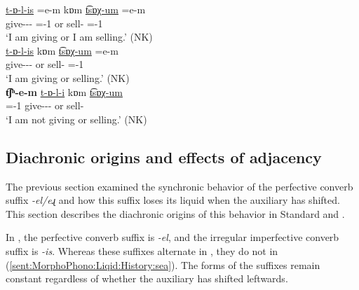\begin{exe}
	\ex \label{sent:MorphoPhono:Liqid:IrrgImpf:Coord}
	\begin{xlist}
		\ex \gll \uline{{t-ɒ-l-is}} \colorbox{lsLightGray}{=e-m} kɒm \uline{{t͡sɒχ-um}} \colorbox{lsLightGray}{=e-m} \\
		give-{\thgloss}-{\infgloss}-{\impfcvb} ={\auxgloss}-1{\sg} or sell-{\impfcvb} ={\auxgloss}-1{\sg}
		\\
		\trans `I am giving or I am selling.' \hfill (NK)
		\\
		\ex \gll \uline{{t-ɒ-l-is}}        kɒm \uline{{t͡sɒχ-um}} \colorbox{lsLightGray}{=e-m} \\
		give-{\thgloss}-{\infgloss}-{\impfcvb}     or sell-{\impfcvb} ={\auxgloss}-1{\sg}
		\\
		\trans `I am giving or selling.' \hfill (NK)
		\\
  \ex \gll \textbf{t͡ʃʰ\colorbox{lsLightGray}{-e-m}} \uline{{t-ɒ-l-i}}        kɒm \uline{{t͡sɒχ-um}}  \\
		{\neggloss}={\auxgloss}-1{\sg} give-{\thgloss}-{\infgloss}-{\impfcvb}     or sell-{\impfcvb} 
		\\
		\trans `I am not giving or selling.' \hfill (NK)
		\\
\end{xlist}	\end{exe}




\subsection{Diachronic origins and effects of adjacency}\label{section:morphophono:auxiliary:EA}\largerpage

The previous section examined the synchronic behavior of the perfective converb suffix \textit{-el/eɻ} and how this suffix loses its liquid when the auxiliary has shifted. This section  describes the diachronic origins of this behavior in Standard and {\seaCEA}. 



In {\seaSEA}, the perfective converb suffix is \textit{-el}, and   the irregular imperfective converb suffix is \textit{-is}. Whereas these suffixes alternate in {\iaIA}, they do not  in {\seaSE} (\ref{sent:MorphoPhono:Liqid:History:sea}). The forms of the suffixes remain constant regardless of whether the auxiliary has shifted leftwards. 

